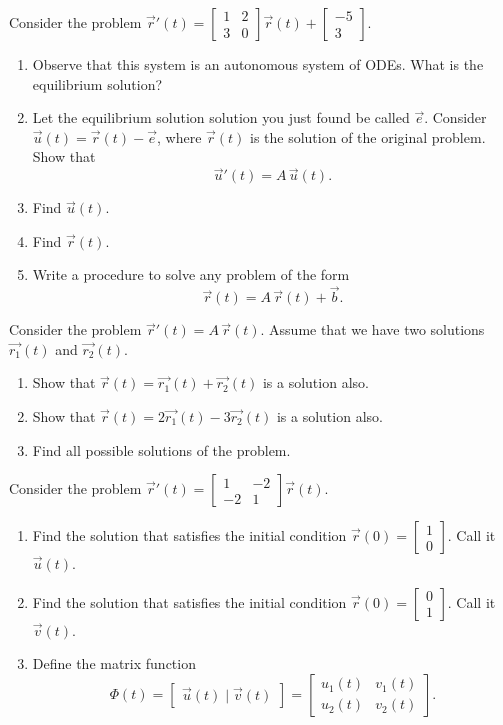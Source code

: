\begin{exercises}
\begin{problist}
	
	\prob \label{prob:sys-nonhomogeneous}Consider the problem  \quad $\vec{r}'(t) = \begin{bmatrix} 1 & 2 \\ 3 & 0 \end{bmatrix}
 \vec{r}(t)+\begin{bmatrix} -5 \\ 3 \end{bmatrix}
$.
	\begin{enumerate}
		\item Observe that this system is an autonomous system of ODEs. What is the equilibrium solution? 
		\item Let the equilibrium solution solution you just found be called $\vec{e}$. Consider $\vec{u}(t) = \vec{r}(t) - \vec{e}$, where $\vec{r}(t)$ is the solution of the original problem. Show that 
			$$ \vec{u}'(t) = A \, \vec{u}(t).$$
		\item Find $\vec{u}(t)$.
		\item Find $\vec{r}(t)$.
		\item Write a procedure to solve any problem of the form
			$$ \vec{r}(t) = A \, \vec{r}(t) + \vec{b}. $$
	\end{enumerate}
	
	
	\prob \label{prob:sys-superposition}Consider the problem \quad $\vec{r}'(t) = A \, \vec{r}(t)$.
	Assume that we have two solutions $\vec{r_1}(t)$ and $\vec{r_2}(t)$.
	\begin{enumerate}
		\item Show that $\vec{r}(t) = \vec{r_1}(t) + \vec{r_2}(t)$ is a solution also.
		\item Show that $\vec{r}(t) = 2\vec{r_1}(t) - 3\vec{r_2}(t)$ is a solution also.
		\item Find all possible solutions of the problem.
	\end{enumerate}
	
	
		\prob Consider the problem $\vec{r}'(t) = \begin{bmatrix} 1 & -2 \\ -2 & 1 \end{bmatrix} \vec{r}(t)$.
		\begin{enumerate}
			\item Find the solution that satisfies the initial condition $\vec{r}(0)=\begin{bmatrix}1 \\ 0\end{bmatrix}$. Call it $\vec{u}(t)$.
			\item Find the solution that satisfies the initial condition $\vec{r}(0)=\begin{bmatrix}0 \\ 1\end{bmatrix}$. Call it $\vec{v}(t)$.
			\item Define the matrix function
			$$ \Phi(t) = \begin{bmatrix} \vec{u}(t) \; | \; \vec{v}(t) \end{bmatrix} = \begin{bmatrix} u_1(t) & v_1(t) \\ u_2(t) & v_2(t) \end{bmatrix}.$$
			

\end{enumerate}
\end{problist}
\end{exercises}
